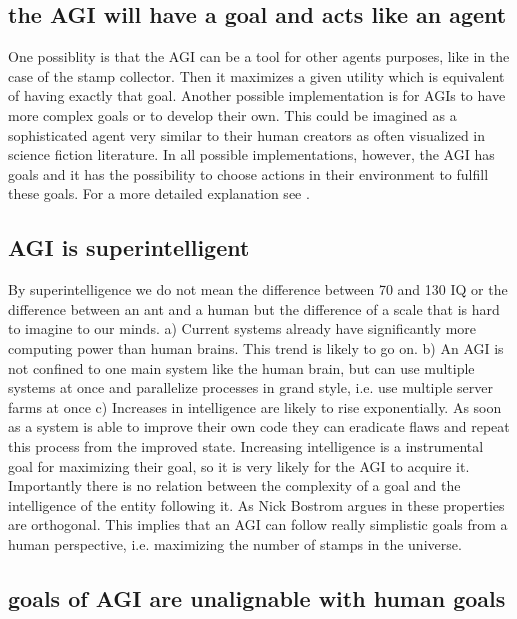 \documentclass[conference]{IEEEtran}
\begin{document}
\subsection{the AGI will have a goal and acts like an agent}
%
One possiblity is that the AGI can be a tool for other agents purposes, like in the case of the stamp collector. Then it maximizes a given utility which is equivalent of having exactly that goal. Another possible implementation is for AGIs to have more complex goals or to develop their own. This could be imagined as a sophisticated agent very similar to their human creators as often visualized in science fiction literature. In all possible implementations, however, the AGI has goals and it has the possibility to choose actions in their environment to fulfill these goals. For a more detailed explanation see \cite{IntelligenceMiles2018}.

\subsection{AGI is superintelligent}

By superintelligence we do not mean the difference between 70 and 130 IQ or the difference between an ant and a human but the difference of a scale that is hard to imagine to our minds. a) Current systems already have significantly more computing power than human brains. This trend is likely to go on. b) An AGI is not confined to one main system like the human brain, but can use multiple systems at once and parallelize processes in grand style, i.e. use multiple server farms at once c) Increases in intelligence are likely to rise exponentially. As soon as a system is able to improve their own code they can eradicate flaws and repeat this process from the improved state. Increasing intelligence is a instrumental goal for maximizing their goal, so it is very likely for the AGI to acquire it. Importantly there is no relation between the complexity of a goal and the intelligence of the entity following it. As Nick Bostrom argues in \cite{OrthoginalityThesisBostrom2012} these properties are orthogonal. This implies that an AGI can follow really simplistic goals from a human perspective, i.e. maximizing the number of stamps in the universe.

\subsection{goals of AGI are unalignable with human goals}
\end{document}

